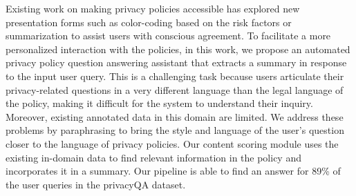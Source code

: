Existing work on making privacy policies accessible has explored new presentation forms such as color-coding based on the risk factors or summarization to assist users with conscious agreement.  To facilitate a more personalized interaction with the policies, in this work, we propose an automated privacy policy question answering assistant that extracts a summary in response to the input user query. This is a challenging task because users articulate their privacy-related questions in a very different language than the legal language of the policy, making it difficult for the system to understand their inquiry. Moreover, existing annotated data in this domain are limited.  We address these problems by paraphrasing to bring the style and language of the user's question closer to the language of privacy policies. Our content scoring module uses the existing in-domain data to find relevant information in the policy and incorporates it in a summary. Our pipeline is able to find an answer for 89\%  of the user queries in the privacyQA dataset.
